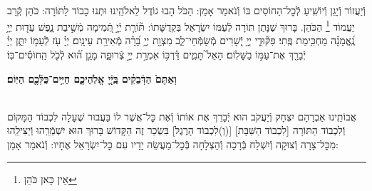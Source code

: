 \documentclass[twoside, openany, parskip=half, 11pt]{book}
\begin{document}
\avharachamim

\\
וְֿיַעֲזוֹר וְֿיָגֵן וְֿיוֹשִֽׁיעַ לְֿכׇל־הַחוֹסִים בּוֹ וְֿנֹאמַר אָמֵן:
הַכֹּל הָבוּ גוֹדֶל לֵאלֹהֵֽינוּ וּתְנוּ כָבוֹד לַתּוֹרָה: כֹּהֵן קְֿרָב יַעֲמוֹד
\footnote{ אֵין כַּאן כֹּהֵן}
הַכֹּהֵן. בָּרוּךְ שֶׁנָּתַן תּוֹרָה לְֿעַמּוֹ יִשְׂרָאֵל בִּקְדֻשָּׁתוֹ:
תּ֘וֹרַ֤ת יְֿיָ֣ תְּֿ֭מִימָה מְֿשִׁ֣יבַת נָ֑פֶשׁ עֵד֖וּת יְיָ֥ נֶֽ֝אֱמָנָ֗ה מַחְכִּ֥ימַת פֶּֽתִי׃ פִּקּ֘וּדֵ֤י יְיָ֣ יְֿ֭שָׁרִים מְֿשַׂמְּֿחֵי־לֵ֑ב מִצְוַ֖ת יְיָ֥ בָּ֝רָ֗ה מְֿאִירַ֥ת עֵינָֽיִם׃
יְיָ֗ עֹ֖ז לְֿעַמּ֣וֹ יִתֵּ֑ן יְיָ֓ יְֿבָרֵ֖ךְ אֶת־עַמּ֣וֹ בַשָּׁלֽוֹם׃
הָאֵל֮ תָּמִ֢ים דַּ֫רְכּ֥וֹ אִמְרַ֣ת יְיָ֣ צְֿרוּפָ֑ה מָגֵ֥ן ה֝֗וּא לְֿכֹ֤ל הַֽחוֹסִ֬ים־בּֽוֹ׃


\textbf{וְאַתֶּם֙ הַדְּֿבֵקִ֔ים בַּֽיְֿ֖יָ אֱלֹֽהֵיכֶ֑ם חַיִּ֥ים־כֻּלְּֿכֶ֖ם הַיּֽוֹם׃} 

\nextpage

\torahbarachu

\hagomel

\\
אֲבוֹתֵֽינוּ אַבְרָהָם יִצְחָק וְֿיַעֲקֹב הוּא יְֿבָרֵךְ אֶת
אוֹתוֹ וְֿאֶת כׇּל־אֲשֶׁר לוֹ
בַּעֲבוּר שֶׁעָלָה לִכְבוֹד הַמָּקוֹם וְֿלִכְבוֹד הַתּוֹרָה
[לִכְבוֹד הַשַּׁבָּת]
[(וְ)לִכְבוֹד הָרֶגֶל]
בִּשְׂכַר זֶה הַקָּדוֹשׁ בָּרוּךְ הוּא יִשְׁמְֿרֵֽהוּ וְֿיַצִּילֵֽהוּ מִכׇּל־צָרָה וְֿצוּקָה וְֿיִשְׁלַח בְּֿרָכָה וְֿהַצְלָחָה בְּֿכׇל־מַעֲשֵׂה יָדָיו עִם כׇּל־יִשְׂרָאֵל אֶחָיו: וְֿנֹאמַר אָמֵן:
\end{document}
